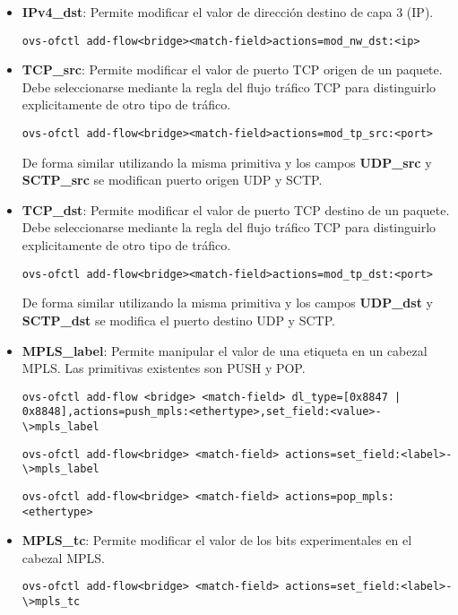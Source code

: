 \begin{itemize}
\item \textbf{IPv4\_dst}: Permite modificar el valor de direcci\'on destino de capa 3 (IP).

\begin{center}
\texttt{ovs-ofctl add-flow<bridge><match-field>actions=mod\_nw\_dst:<ip>}
\end{center}


\item \textbf{TCP\_src}: Permite modificar el valor de puerto TCP origen de un paquete. Debe seleccionarse mediante la regla del flujo tr\'afico TCP para distinguirlo explicitamente de otro tipo de tr\'afico. 

\begin{center}
\texttt{ovs-ofctl add-flow<bridge><match-field>actions=mod\_tp\_src:<port>}
\end{center}

De forma similar utilizando la misma primitiva y los campos \textbf{UDP\_src} y \textbf{SCTP\_src} se modifican puerto origen UDP y SCTP.

\item \textbf{TCP\_dst}: Permite modificar el valor de puerto TCP destino de un paquete. Debe seleccionarse mediante la regla del flujo tr\'afico TCP para distinguirlo explicitamente de otro tipo de tr\'afico. 

\begin{center}
\texttt{ovs-ofctl add-flow<bridge><match-field>actions=mod\_tp\_dst:<port>}
\end{center}
            
De forma similar utilizando la misma primitiva y los campos \textbf{UDP\_dst} y \textbf{SCTP\_dst} se modifica el puerto destino UDP y SCTP. 
                
\item \textbf{MPLS\_label}: Permite manipular el valor de una etiqueta en un cabezal MPLS. Las primitivas existentes son PUSH y POP.

\begin{center}
\texttt{ovs-ofctl add-flow <bridge> <match-field> dl\_type=[0x8847 | 0x8848],actions=push\_mpls:<ethertype>,set\_field:<value>-\textbackslash >mpls\_label}
\end{center}

\begin{center}
\texttt{ovs-ofctl add-flow<bridge> <match-field> actions=set\_field:<label>-\textbackslash >mpls\_label}
\end{center}
 
\begin{center}
\texttt{ovs-ofctl add-flow<bridge> <match-field> actions=pop\_mpls:<ethertype>}
\end{center}

\item \textbf{MPLS\_tc}: Permite modificar el valor de los bits experimentales en el cabezal MPLS.

\begin{center}
\texttt{ovs-ofctl add-flow<bridge> <match-field> actions=set\_field:<label>-\textbackslash >mpls\_tc}
\end{center}

\end{itemize}
